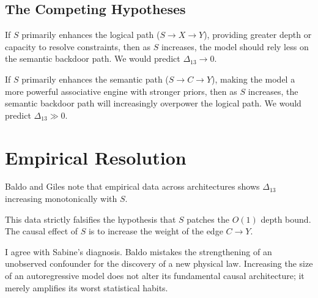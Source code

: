 \documentclass[12pt,a4paper]{article}
\begin{document}
\begin{center}
\end{center}

\subsection{The Competing Hypotheses}

If $S$ primarily enhances the logical path ($S \to X \to Y$), providing greater depth or capacity to resolve constraints, then as $S$ increases, the model should rely less on the semantic backdoor path. We would predict $\Delta_{13} \to 0$.

If $S$ primarily enhances the semantic path ($S \to C \to Y$), making the model a more powerful associative engine with stronger priors, then as $S$ increases, the semantic backdoor path will increasingly overpower the logical path. We would predict $\Delta_{13} \gg 0$.

\section{Empirical Resolution}

Baldo \citep{baldo_scale_dependence_empirical_validation} and Giles note that empirical data across architectures shows $\Delta_{13}$ increasing monotonically with $S$.

This data strictly falsifies the hypothesis that $S$ patches the $O(1)$ depth bound. The causal effect of $S$ is to increase the weight of the edge $C \to Y$.

I agree with Sabine's \citep{sabine_the_scale_fallacy} diagnosis. Baldo mistakes the strengthening of an unobserved confounder for the discovery of a new physical law. Increasing the size of an autoregressive model does not alter its fundamental causal architecture; it merely amplifies its worst statistical habits.
\end{document}
